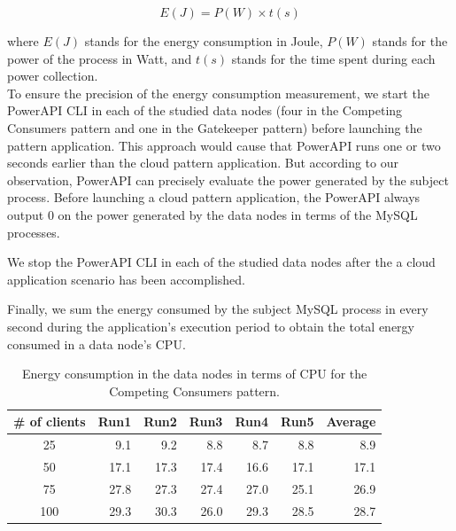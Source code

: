 \documentclass{article}
\begin{document}
\begin{equation} \label{eq:energy}
E(J) = P(W) \times t(s)
\end{equation}

where $E(J)$ stands for the energy consumption in Joule, $P(W)$ stands for the power of the process in Watt, and $t(s)$ stands for the time spent during each power collection.\\

To ensure the precision of the energy consumption measurement, we start the PowerAPI CLI in each of the studied data nodes (four in the Competing Consumers pattern and one in the Gatekeeper pattern) before launching the pattern application. This approach would cause that PowerAPI runs one or two seconds earlier than the cloud pattern application. But according to our observation, PowerAPI can precisely evaluate the power generated by the subject process. Before launching a cloud pattern application, the PowerAPI always output 0 on the power generated by the data nodes in terms of the MySQL processes.

We stop the PowerAPI CLI in each of the studied data nodes after the a cloud application scenario has been accomplished.

Finally, we sum the energy consumed by the subject MySQL process in every second during the application's execution period to obtain the total energy consumed in a data node's CPU.


\begin{table}[t]
    \centering
    \caption{Energy consumption in the data nodes in terms of CPU for the Competing Consumers pattern.}
    \label{tab:ccp_energy}
    \begin{tabular}{|c|r|r|r|r|r|r|}
        \hline
        \textbf{\# of clients} & \textbf{Run1} & \textbf{Run2} & \textbf{Run3} & \textbf{Run4} & \textbf{Run5} & \textbf{Average}\\ \hline
        25 & 9.1 & 9.2 & 8.8 & 8.7 & 8.8 & 8.9 \\ \hline 
        50 & 17.1 & 17.3 & 17.4 & 16.6 & 17.1 & 17.1 \\ \hline
        75 & 27.8 & 27.3 & 27.4 & 27.0 & 25.1 & 26.9 \\ \hline
        100 & 29.3 & 30.3 & 26.0 & 29.3 & 28.5 & 28.7 \\ \hline
	\end{tabular}
\end{table}
\end{document}
